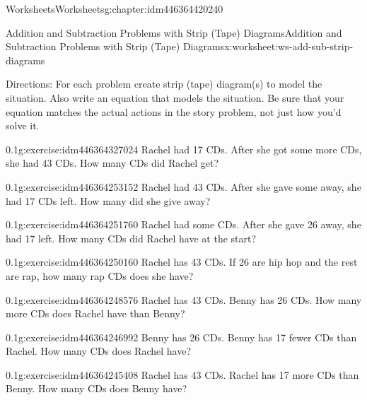 \documentclass[twoside,11pt,]{book}
\begin{document}
\begin{chapterptx}{Worksheets}{}{Worksheets}{}{}{g:chapter:idm446364420240}
%
\begin{worksheet-section-numberless}{Addition and Subtraction Problems with Strip (Tape) Diagrams}{}{Addition and Subtraction Problems with Strip (Tape) Diagrams}{}{}{x:worksheet:ws-add-sub-strip-diagrams}
\begin{introduction}{}%
Directions: For each problem create strip (tape) diagram(s) to model the situation.  Also write an equation that models the situation.  Be sure that your equation matches the actual actions in the story problem, not just how you’d solve it.%
\end{introduction}%
\begin{divisionexercise}{1}{}{0.1}{g:exercise:idm446364327024}%
Rachel had 17 CDs.  After she got some more CDs, she had 43 CDs.  How many CDs did Rachel get?%
\end{divisionexercise}%
\begin{divisionexercise}{2}{}{0.1}{g:exercise:idm446364253152}%
Rachel had 43 CDs.  After she gave some away, she had 17 CDs left.  How many did she give away?%
\end{divisionexercise}%
\begin{divisionexercise}{3}{}{0.1}{g:exercise:idm446364251760}%
Rachel had some CDs.  After she gave 26 away, she had 17 left.  How many CDs did Rachel have at the start?%
\end{divisionexercise}%
\begin{divisionexercise}{4}{}{0.1}{g:exercise:idm446364250160}%
Rachel has 43 CDs.  If 26 are hip hop and the rest are rap, how many rap CDs does she have?%
\end{divisionexercise}%
\begin{divisionexercise}{5}{}{0.1}{g:exercise:idm446364248576}%
Rachel has 43 CDs.  Benny has 26 CDs.  How many more CDs does Rachel have than Benny?%
\end{divisionexercise}%
\begin{divisionexercise}{6}{}{0.1}{g:exercise:idm446364246992}%
Benny has 26 CDs. Benny has 17 fewer CDs than Rachel.  How many CDs does Rachel have?%
\end{divisionexercise}%
\begin{divisionexercise}{7}{}{0.1}{g:exercise:idm446364245408}%
Rachel has 43 CDs. Rachel has 17 more CDs than Benny.  How many CDs does Benny have?%
\end{divisionexercise}%
\end{worksheet-section-numberless}
\restoregeometry

\end{chapterptx}
\end{document}
